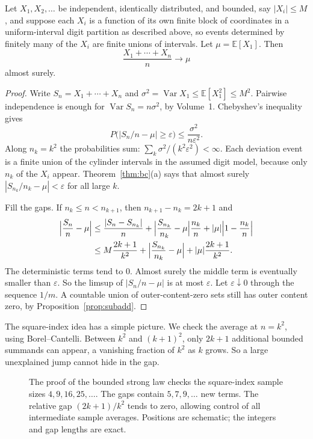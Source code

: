 \begin{theorem}\label{thm:sllnbound}
Let $X_1,X_2,\ldots$ be independent, identically distributed, and bounded, say $|X_i|\le M$, and suppose each $X_i$ is a function of its own finite block of coordinates in a uniform-interval digit partition as described above, so events determined by finitely many of the $X_i$ are finite unions of intervals. Let $\mu=\mathbb E[X_1]$. Then
\[
 \frac{X_1+\cdots+X_n}{n}\to\mu
\]
almost surely.
\end{theorem}
\begin{proof}
Write $S_n=X_1+\cdots+X_n$ and $\sigma^2=\operatorname{Var}X_1\le\mathbb E[X_1^2]\le M^2$. Pairwise independence is enough for $\operatorname{Var}S_n=n\sigma^2$, by Volume~1. Chebyshev's inequality gives
\[
 P\bigl(|S_n/n-\mu|\ge\varepsilon\bigr)\le\frac{\sigma^2}{n\varepsilon^2}.
\]
Along $n_k=k^2$ the probabilities sum: $\sum_k\sigma^2/(k^2\varepsilon^2)<\infty$. Each deviation event is a finite union of the cylinder intervals in the assumed digit model, because only $n_k$ of the $X_i$ appear. Theorem~\ref{thm:bc}(a) says that almost surely $|S_{n_k}/n_k-\mu|<\varepsilon$ for all large $k$.

Fill the gaps. If $n_k\le n<n_{k+1}$, then $n_{k+1}-n_k=2k+1$ and
\begin{align*}
\Bigl|\frac{S_n}{n}-\mu\Bigr|
&\le\frac{|S_n-S_{n_k}|}{n}+\Bigl|\frac{S_{n_k}}{n_k}-\mu\Bigr|\frac{n_k}{n}+|\mu|\Bigl|1-\frac{n_k}{n}\Bigr|\\
&\le M\frac{2k+1}{k^2}+\Bigl|\frac{S_{n_k}}{n_k}-\mu\Bigr|+|\mu|\frac{2k+1}{k^2}.
\end{align*}
The deterministic terms tend to $0$. Almost surely the middle term is eventually smaller than $\varepsilon$. So the limsup of $|S_n/n-\mu|$ is at most $\varepsilon$. Let $\varepsilon\downarrow0$ through the sequence $1/m$. A countable union of outer-content-zero sets still has outer content zero, by Proposition~\ref{prop:subadd}.
\end{proof}

The square-index idea has a simple picture. We check the average at $n=k^2$, using Borel--Cantelli. Between $k^2$ and $(k+1)^2$, only $2k+1$ additional bounded summands can appear, a vanishing fraction of $k^2$ as $k$ grows. So a large unexplained jump cannot hide in the gap.

\begin{figure}[ht]
\centering
{}
\caption{The proof of the bounded strong law checks the square-index sample sizes $4,9,16,25,\ldots$. The gaps contain $5,7,9,\ldots$ new terms. The relative gap $(2k+1)/k^2$ tends to zero, allowing control of all intermediate sample averages. Positions are schematic; the integers and gap lengths are exact.}
\label{fig:squaregaps}
\end{figure}

